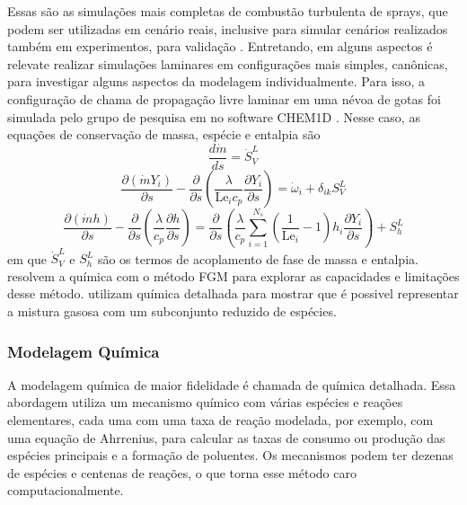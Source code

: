 Essas são as simulações mais completas de combustão turbulenta de sprays, que podem ser utilizadas em cenário reais, inclusive para simular cenários realizados também em experimentos, para validação \source{}.
Entretando, em alguns aspectos é relevate realizar simulações laminares em configurações mais simples, canônicas, para investigar alguns aspectos da modelagem individualmente. 
Para isso, a configuração de chama de propagação livre laminar em uma névoa de gotas foi simulada pelo grupo de pesquisa em \cite{SacomanoF2018CTM, SacomanoF2019IJHMT} no software CHEM1D \cite{Sommers1994PhD}.
Nesse caso, as equações de conservação de massa, espécie e entalpia são \cite{SacomanoF2018CTM,SacomanoF2021Fluids, }
\begin{equation}
    \frac{d \dot m}{d s} = \dot S_V^L
\end{equation}
\begin{equation}
    \frac{\partial(\dot m Y_i)}{\partial s} -
    \frac{\partial}{\partial s} \left(
        \frac{\lambda}{\mathrm{Le}_i c_p} \frac{\partial Y_i}{\partial s}
    \right) =
    \dot \omega_i + \delta_{ik}S_V^L
\end{equation}
\begin{equation}
    \frac{\partial(\dot m h)}{\partial s}
    -
    \frac{\partial}{\partial s} \left(\frac{\lambda}{c_p} \frac{\partial h}{\partial s} \right)
    =
    \frac{\partial}{\partial s} \left(
            \frac{\lambda}{c_p}\sum_{i=1}^{N_s}
            \left(\frac{1}{\mathrm{Le}_i}-1\right)
            h_i \frac{\partial Y_i}{\partial s} 
        \right)
        +
    S_h^L
\end{equation}
em que $\dot S_V^L$ e $S_h^L$ são os termos de acoplamento de fase de massa e entalpia.
 resolvem a química com o método FGM para explorar as capacidades e limitações desse método.
 utilizam química detalhada para mostrar que é possivel representar a mistura gasosa com um subconjunto reduzido de espécies.  


\subsubsection{Modelagem Química} \label{sec:chem}

A modelagem química de maior fidelidade é chamada de química detalhada.
Essa abordagem utiliza um mecanismo químico com várias espécies e reações elementares, cada uma com uma taxa de reação modelada, por exemplo, com uma equação de Ahrrenius, para calcular as taxas de consumo ou produção das espécies principais e a formação de poluentes.
Os mecanismos podem ter dezenas de espécies e centenas de reações, o que torna esse método caro computacionalmente.

